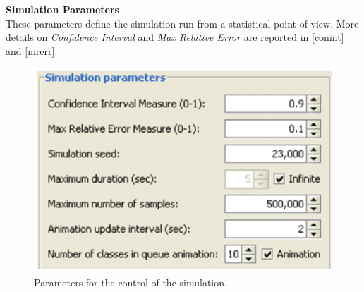 \noindent \textbf{Simulation Parameters}\\
These parameters define the simulation run from a statistical
point of view. More details on \emph{Confidence Interval} and \emph{Max
Relative
Error} are reported in \autoref{conint} and \autoref{mrerr}.\\
\begin{figure}[htb]
    \begin{center}
        \includegraphics[scale=.5]{img/jsimg/9.4.eps}
    \end{center}
    \caption{Parameters for the control of the simulation.}
    \label{fig:simcontr}
\end{figure}
